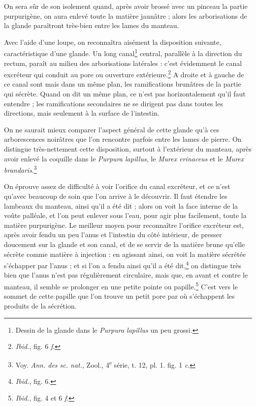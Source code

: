 \documentclass[a4paper, 11pt, oneside, polutonikogreek, french]{article}
\begin{document}
On sera sûr de son isolement quand, après avoir brossé avec un pinceau la partie purpurigène, on aura enlevé toute la matière jaunâtre ; alors les arborisations de la glande paraîtront très-bien entre les lames du manteau.

Avec l'aide d'une loupe, on reconnaîtra aisément la disposition suivante, caractéristique d'une glande. Un long canal\footnote{Dessin de la glande dans le \emph{Purpura lapillus} un peu grossi.} central, parallèle à la direction du rectum, paraît au milieu des arborisations latérales : c'est évidemment le canal excréteur qui conduit au pore ou ouverture extérieure.\footnote{\emph{Ibid.}, fig. 6 \emph{f}.} A droite et à gauche de ce canal sont mais dans un même plan, les ramifications brunâtres de la partie qui sécrète. Quand on dit un même plan, ce n'est pas horizontalement qu'il faut entendre ; les ramifications secondaires ne se dirigent pas dans toutes les directions, mais seulement à la surface de l'intestin.

On ne saurait mieux comparer l'aspect général de cette glande qu'à ces arborescences noirâtres que l'on rencontre parfois entre les lames de pierre. On distingue très-nettement cette disposition, surtout à l'extérieur du manteau, après avoir enlevé la coquille dans le \emph{Purpura lapillus}, le \emph{Murex erinaceus} et le \emph{Murex brandaris}.\footnote{Voy. \emph{Ann. des sc. nat.}, Zool., 4\textsuperscript{e} série, t. 12, pl. 1. fig. 1 \emph{c}.}

On éprouve assez de difficulté à voir l'orifice du canal excréteur, et ce n'est qu'avec beaucoup de soin que l'on arrive à le découvrir. Il faut étendre les lambeaux du manteau, ainsi qu'il a été dit ; alors on voit la face interne de la voûte palléale, et l'on peut enlever sous l'eau, pour agir plus facilement, toute la matière purpurigène. Le meilleur moyen pour reconnaître l'orifice excréteur est, après avoir fendu un peu l'anus et l'intestin du côté intérieur, de presser doucement sur la glande et son canal, et de se servir de la matière brune qu'elle sécrète comme matière à injection : en agissant ainsi, on voit la matière sécrétée s'échapper par l'anus ; et si l'on a fendu ainsi qu'il a été dit,\footnote{\emph{Ibid.}, fig. 6.} on distingue très bien que l'anus n'est pas régulièrement circulaire, mais que, en avant et contre le manteau, il semble se prolonger en une petite pointe ou papille.\footnote{\emph{Ibid.}, fig. 4 et 6 \emph{f}.} C'est vers le sommet de cette papille que l'on trouve un petit pore par où s'échappent les produits de la sécrétion.
\end{document}
